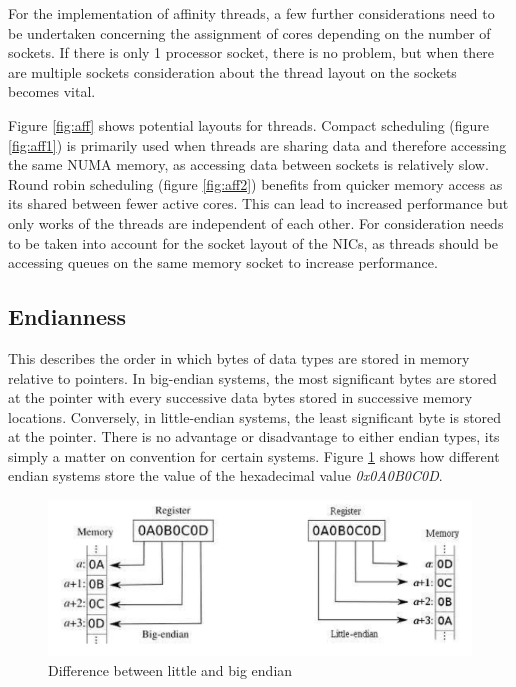 \documentclass[final_report.tex]{subfiles}
\begin{document}
For the implementation of affinity threads, a few further considerations need to be undertaken concerning the assignment of cores depending on the number of sockets. If there is only 1 processor socket, there is no problem, but when there are multiple sockets consideration about the thread layout on the sockets becomes vital.

Figure \ref{fig:aff} shows potential layouts for threads. Compact scheduling (figure \ref{fig:aff1}) is primarily used when threads are sharing data and therefore accessing the same NUMA memory, as accessing data between sockets is relatively slow. Round robin scheduling (figure \ref{fig:aff2}) benefits from quicker memory access as its shared between fewer active cores. This can lead to increased performance but only works of the threads are independent of each other. For consideration needs to be taken into account for the socket layout of the NICs, as threads should be accessing queues on the same memory socket to increase performance.

\newpage

\subsection{Endianness}
This describes the order in which bytes of data types are stored in memory relative to pointers. In big-endian systems, the most significant bytes are stored at the pointer with every successive data bytes stored in successive memory locations. Conversely, in little-endian systems, the least significant byte is stored at the pointer. There is no advantage or disadvantage to either endian types, its simply a matter on convention for certain systems. Figure \ref{fig:endian} shows how different endian systems store the value of the hexadecimal value \textit{0x0A0B0C0D}. 

\begin{figure}[H]
	\centering
	\includegraphics[width=\textwidth]{img/endian.png}
	\caption{Difference between little and big endian}
	\label{fig:endian}
\end{figure}
\end{document}
